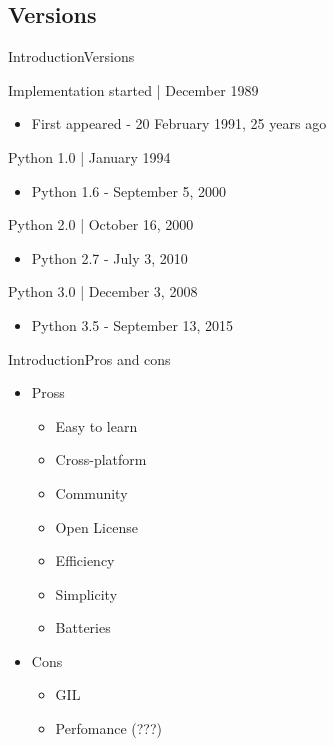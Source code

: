 \documentclass[10pt]{beamer}
\begin{document}
\subsection{Versions}
\begin{frame}{Introduction}{Versions}
	\begin{block}{Implementation started | December 1989}
		\begin{itemize}
			\item First appeared - 20 February 1991, 25 years ago
		\end{itemize}
	\end{block}	
		
	\begin{block}{Python 1.0 | January 1994}
		\begin{itemize}
			\item Python 1.6 - September 5, 2000
		\end{itemize}
	\end{block}	
	
	\begin{block}{Python 2.0 | October 16, 2000}
		\begin{itemize}
			\item Python 2.7 - July 3, 2010
		\end{itemize}
	\end{block}
	
	\begin{block}{Python 3.0 | December 3, 2008}
		\begin{itemize}
			\item Python 3.5 - September 13, 2015
		\end{itemize}
	\end{block}
\end{frame}


\begin{frame}{Introduction}{Pros and cons}
	\begin{itemize}
		\item Pross
		\begin{itemize}
			\item Easy to learn
			\item Cross-platform
			\item Community
			\item Open License
			\item Efficiency
			\item Simplicity
			\item Batteries
		\end{itemize}
		
		
		\item Cons
		\begin{itemize}
			\item GIL
			\item Perfomance (???)
		\end{itemize}
		
	\end{itemize}	
\end{frame}
\end{document}

